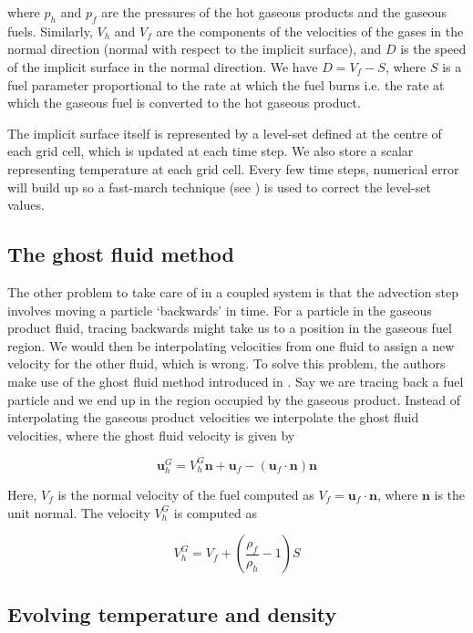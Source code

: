 \documentclass[a4paper]{report}
\begin{document}
where $p_h$ and $p_f$ are the pressures of the hot gaseous products and the gaseous fuels. Similarly, $V_h$ and $V_f$ are the components of the velocities of the gases in the normal direction (normal with respect to the implicit surface), and $D$ is the speed of the implicit surface in the normal direction. We have $D = V_f - S$, where $S$ is a fuel parameter proportional to the rate at which the fuel burns i.e. the rate at which the gaseous fuel is converted to the hot gaseous product.

The implicit surface itself is represented by a level-set defined at the centre of each grid cell, which is updated at each time step. We also store a scalar representing temperature at each grid cell. Every few time steps, numerical error will build up so a fast-march technique (see \cite{sethian}) is used to correct the level-set values.

\subsection{The ghost fluid method}

The other problem to take care of in a coupled system is that the advection step involves moving a particle `backwards' in time. For a particle in the gaseous product fluid, tracing backwards might take us to a position in the gaseous fuel region. We would then be interpolating velocities from one fluid to assign a new velocity for the other fluid, which is wrong. To solve this problem, the authors make use of the ghost fluid method introduced in \cite{ghost}. Say we are tracing back a fuel particle and we end up in the region occupied by the gaseous product. Instead of interpolating the gaseous product velocities we interpolate the ghost fluid velocities, where the ghost fluid velocity is given by

\begin{equation}
\mathbf{u}^G_h = V^G_h\mathbf{n} + \mathbf{u}_f - (\mathbf{u}_f\cdot\mathbf{n})\mathbf{n}
\end{equation}

Here, $V_f$ is the normal velocity of the fuel computed as $V_f = \mathbf{u}_f\cdot\mathbf{n}$, where $\mathbf{n}$ is the unit normal. The velocity $V^G_h$ is computed as

\begin{equation}
V^G_h = V_f + (\dfrac{\rho_f}{\rho_h} - 1)S
\end{equation}

\subsection{Evolving temperature and density}
\end{document}
